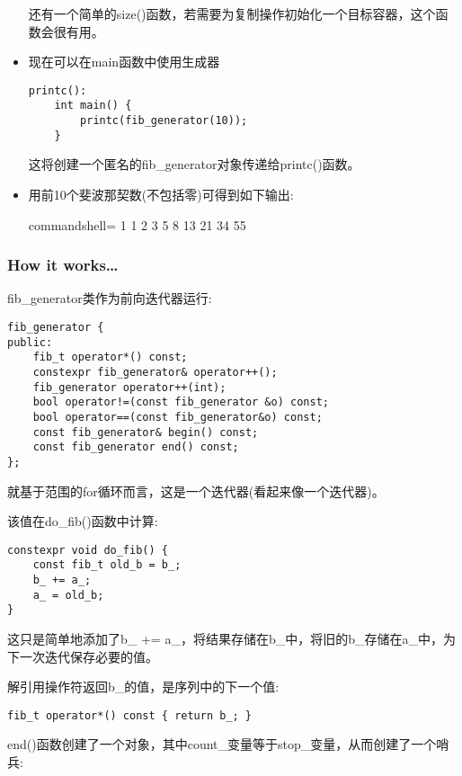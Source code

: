 \begin{itemize}
还有一个简单的size()函数，若需要为复制操作初始化一个目标容器，这个函数会很有用。

\item 
现在可以在main函数中使用生成器

\begin{lstlisting}[style=styleCXX]
printc():
	int main() {
		printc(fib_generator(10));
	}
\end{lstlisting}

这将创建一个匿名的fib\_generator对象传递给printc()函数。

\item 
用前10个斐波那契数(不包括零)可得到如下输出:

\begin{tcblisting}{commandshell={}}
1 1 2 3 5 8 13 21 34 55
\end{tcblisting}
\end{itemize}

\subsubsection{How it works…}

fib\_generator类作为前向迭代器运行:

\begin{lstlisting}[style=styleCXX]
fib_generator {
public:
	fib_t operator*() const;
	constexpr fib_generator& operator++();
	fib_generator operator++(int);
	bool operator!=(const fib_generator &o) const;
	bool operator==(const fib_generator&o) const;
	const fib_generator& begin() const;
	const fib_generator end() const;
};
\end{lstlisting}

就基于范围的for循环而言，这是一个迭代器(看起来像一个迭代器)。

该值在do\_fib()函数中计算:

\begin{lstlisting}[style=styleCXX]
constexpr void do_fib() {
	const fib_t old_b = b_;
	b_ += a_;
	a_ = old_b;
}
\end{lstlisting}

这只是简单地添加了b\_ += a\_，将结果存储在b\_中，将旧的b\_存储在a\_中，为下一次迭代保存必要的值。

解引用操作符返回b\_的值，是序列中的下一个值:

\begin{lstlisting}[style=styleCXX]
fib_t operator*() const { return b_; }
\end{lstlisting}

end()函数创建了一个对象，其中count\_变量等于stop\_变量，从而创建了一个哨兵:

